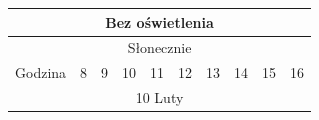 \documentclass[a4paper,12pt]{article}
\begin{document}
	\begin{table}[!ht]
\begin{tabular}{|c|c|c|c|c|c|c|c|c|c|}
\hline
\multicolumn{10}{|c|}{\cellcolor[HTML]{C8DFC8}Bez oświetlenia}                                                                                                                                                                                                                                                                                                                                                                                                                                                                                                                                                                                                                                                                    \\ \hline
\multicolumn{10}{|c|}{\cellcolor[HTML]{EDD9A0}Słonecznie}                                                                                                                                                                                                                                                                                                                                                                                                                                                                                                                                                                                                                                                                         \\ \hline
Godzina                                & \cellcolor[HTML]{FFFFFF}8                                               & \cellcolor[HTML]{FFFFFF}9                                               & \cellcolor[HTML]{FFFFFF}10                                              & \cellcolor[HTML]{FFFFFF}11                                              & \cellcolor[HTML]{FFFFFF}12                                              & \cellcolor[HTML]{FFFFFF}13                                              & \cellcolor[HTML]{FFFFFF}14                                              & \cellcolor[HTML]{FFFFFF}15                                              & \cellcolor[HTML]{FFFFFF}16                                              \\ \hline
\multicolumn{10}{|c|}{10 Luty}                                                                                                                                                                                                                                                                                                                                                                                                                                                                                                                                                                                                                                                                                                    \\ \hline

\end{tabular}
\end{table}
\end{document}
